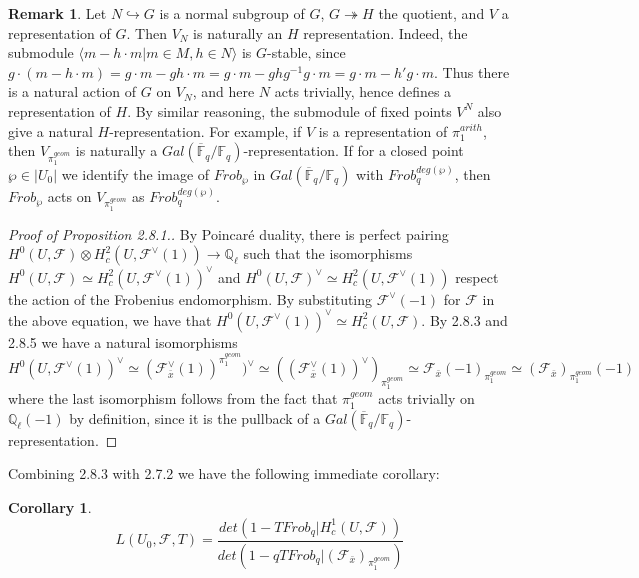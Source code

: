 \documentclass{ucbthesis}
\theoremstyle{definition}
\newtheorem{rmk}[thm]{Remark}
\theoremstyle{theorem}
\newtheorem{cor}[thm]{Corollary}
\begin{document}
\begin{rmk}
Let $N\hookrightarrow G$ is a normal subgroup of $G$, $G\twoheadrightarrow H$ the quotient, and $V$ a representation of $G$. Then $V_{N}$ is naturally an $H$ representation. Indeed, the submodule $\langle m-h\cdot m|m\in M, h\in N\rangle$ is $G$-stable, since $g\cdot (m-h\cdot m) = g\cdot m - gh
\cdot m =g\cdot m - ghg^{-1}g\cdot m = g\cdot m - h'g\cdot m$. Thus there is a natural action of $G$ on
 $V_{N}$, and here $N$ acts trivially, hence defines a representation of $H$. By similar reasoning, the
  submodule of fixed points $V^{N}$ also give a natural $H$-representation. For example, if $V$ is a
   representation of $\pi_{1}^{arith}$, then $V_{\pi_{1}^{geom}}$ is naturally a
    $Gal(\overline{\mathbb{F}}_q/\mathbb{F}_q)$-representation. If for a closed point $\wp \in |U_{0}|$
     we identify the image of $Frob_{\wp}$ in $Gal(\overline{\mathbb{F}}_q/\mathbb{F}_q)$ with
      $Frob_{q}^{deg(\wp)}$, then $Frob_{\wp}$ acts on $V_{\pi_{1}^{geom}}$ as $Frob_{q}^{deg(\wp)}$. 

\end{rmk}


\begin{proof}[Proof of Proposition 2.8.1.]
By Poincar\'{e} duality, there is perfect pairing \\ $H^{0}(U,\mathcal{F}) \otimes 
H^{2}_{c}(U,\mathcal{F}^{\vee}(1)) \rightarrow \mathbb{Q}_{\ell}$ such that the isomorphisms 
 $H^{0}(U,\mathcal{F}) \simeq H^{2}_{c}(U,\mathcal{F}^{\vee}(1))^{\vee}$ and $H^{0}(U,\mathcal{F})^{\vee}
  \simeq H^{2}_{c}(U,\mathcal{F}^{\vee}(1))$ respect the action of the Frobenius endomorphism. By
   substituting $\mathcal{F}^{\vee}(-1)$ for $\mathcal{F}$ in the above equation, we have that
    $H^{0}(U,\mathcal{F}^{\vee}(1))^{\vee} \simeq H^{2}_{c}(U,\mathcal{F})$. By 2.8.3 and 2.8.5 
    we have a natural isomorphisms $H^{0}(U,\mathcal{F}^{\vee}(1))^{\vee}\simeq
     (\mathcal{F}^{\vee}_{\bar{x}}(1))^{\pi_{1}^{geom}})^{\vee} \simeq 
     ((\mathcal{F}_{\bar{x}}^{\vee}(1))^{\vee})_{\pi_{1}^{geom}} \simeq \mathcal{F}_{\bar{x}}(-1)_{\pi_{1}^{geom}} \simeq (\mathcal{F}_{\bar{x}})_{\pi_{1}^{geom}}(-1)$ 
     where the last isomorphism follows from the fact that $\pi_{1}^{geom}$ acts trivially on $\mathbb{Q}_{\ell}(-1)$ by definition, since it is the pullback of a
      $Gal(\overline{\mathbb{F}}_{q}/\mathbb{F}_{q})$-representation. 
\end{proof}
Combining 2.8.3 with 2.7.2 we have the following immediate corollary:
\begin{cor}
$$L(U_{0},\mathcal{F},T) = \frac{det(1-TFrob_{q}|H^{1}_{c}(U,\mathcal{F}))}{det(1-qTFrob_{q}|(\mathcal{F}_{\bar{x}})_{\pi_{1}^{geom}})}$$
\end{cor}
\end{document}
